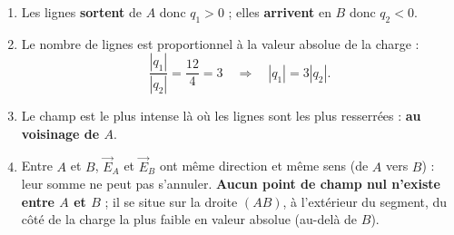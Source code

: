 \documentclass[11pt]{article}
\begin{document}
\begin{corrige}
\begin{enumerate}
\item Les lignes \textbf{sortent} de $A$ donc $q_1 > 0$ ; elles \textbf{arrivent} en $B$ donc $q_2 < 0$.
\item Le nombre de lignes est proportionnel à la valeur absolue de la charge :
\[ \frac{|q_1|}{|q_2|} = \frac{12}{4} = 3 \quad\Rightarrow\quad |q_1| = 3|q_2|. \]
\item Le champ est le plus intense là où les lignes sont les plus resserrées : \textbf{au voisinage de $A$}.
\item Entre $A$ et $B$, $\vec{E}_A$ et $\vec{E}_B$ ont même direction et même sens (de $A$ vers $B$) : leur somme ne peut pas s'annuler. \textbf{Aucun point de champ nul n'existe entre $A$ et $B$} ; il se situe sur la droite $(AB)$, à l'extérieur du segment, du côté de la charge la plus faible en valeur absolue (au-delà de $B$).
\end{enumerate}
\end{corrige}
\end{document}
